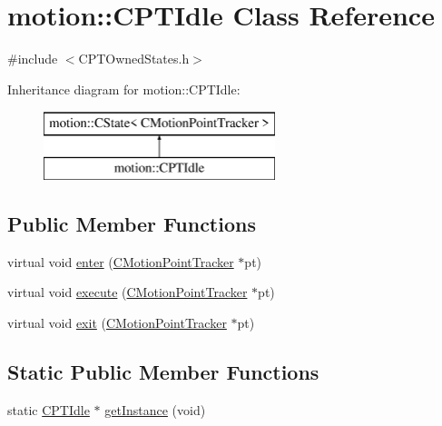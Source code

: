 \hypertarget{classmotion_1_1CPTIdle}{}\section{motion\+:\+:C\+P\+T\+Idle Class Reference}
\label{classmotion_1_1CPTIdle}


{\ttfamily \#include $<$C\+P\+T\+Owned\+States.\+h$>$}

Inheritance diagram for motion\+:\+:C\+P\+T\+Idle\+:\begin{figure}[H]
\begin{center}
\leavevmode
\includegraphics[height=2.000000cm]{classmotion_1_1CPTIdle}
\end{center}
\end{figure}
\subsection*{Public Member Functions}
\begin{DoxyCompactItemize}
\item 
virtual void \mbox{\hyperlink{classmotion_1_1CPTIdle_ad77ab399843dcf692d683747dbf51dd4}{enter}} (\mbox{\hyperlink{classmotion_1_1CMotionPointTracker}{C\+Motion\+Point\+Tracker}} $\ast$pt)
\item 
virtual void \mbox{\hyperlink{classmotion_1_1CPTIdle_af41acb6cf867df293faf85bfbff91940}{execute}} (\mbox{\hyperlink{classmotion_1_1CMotionPointTracker}{C\+Motion\+Point\+Tracker}} $\ast$pt)
\item 
virtual void \mbox{\hyperlink{classmotion_1_1CPTIdle_aed48db9a7d0c9364c1f93bf0787810a4}{exit}} (\mbox{\hyperlink{classmotion_1_1CMotionPointTracker}{C\+Motion\+Point\+Tracker}} $\ast$pt)
\end{DoxyCompactItemize}
\subsection*{Static Public Member Functions}
\begin{DoxyCompactItemize}
\item 
static \mbox{\hyperlink{classmotion_1_1CPTIdle}{C\+P\+T\+Idle}} $\ast$ \mbox{\hyperlink{classmotion_1_1CPTIdle_ab9b92c59fb6b828a0fd5e90ec230c1f9}{get\+Instance}} (void)
\end{DoxyCompactItemize}


